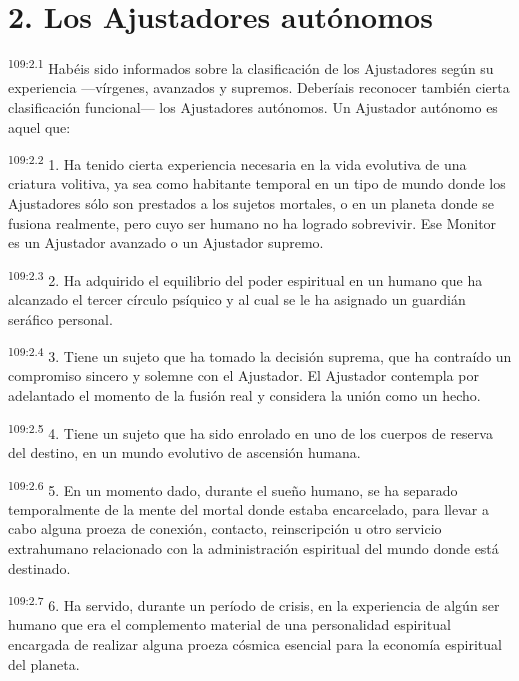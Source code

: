 \documentclass[twoside, 11pt]{book}
\begin{document}
\section*{2. Los Ajustadores autónomos}
\par
\textsuperscript{109:2.1} Habéis sido informados sobre la clasificación de los Ajustadores según su experiencia ---vírgenes, avanzados y supremos. Deberíais reconocer también cierta clasificación funcional--- los Ajustadores autónomos. Un Ajustador autónomo es aquel que:

\par
\textsuperscript{109:2.2} 1. Ha tenido cierta experiencia necesaria en la vida evolutiva de una criatura volitiva, ya sea como habitante temporal en un tipo de mundo donde los Ajustadores sólo son prestados a los sujetos mortales, o en un planeta donde se fusiona realmente, pero cuyo ser humano no ha logrado sobrevivir. Ese Monitor es un Ajustador avanzado o un Ajustador supremo.

\par
\textsuperscript{109:2.3} 2. Ha adquirido el equilibrio del poder espiritual en un humano que ha alcanzado el tercer círculo psíquico y al cual se le ha asignado un guardián seráfico personal.

\par
\textsuperscript{109:2.4} 3. Tiene un sujeto que ha tomado la decisión suprema, que ha contraído un compromiso sincero y solemne con el Ajustador. El Ajustador contempla por adelantado el momento de la fusión real y considera la unión como un hecho.

\par
\textsuperscript{109:2.5} 4. Tiene un sujeto que ha sido enrolado en uno de los cuerpos de reserva del destino, en un mundo evolutivo de ascensión humana.

\par
\textsuperscript{109:2.6} 5. En un momento dado, durante el sueño humano, se ha separado temporalmente de la mente del mortal donde estaba encarcelado, para llevar a cabo alguna proeza de conexión, contacto, reinscripción u otro servicio extrahumano relacionado con la administración espiritual del mundo donde está destinado.

\par
\textsuperscript{109:2.7} 6. Ha servido, durante un período de crisis, en la experiencia de algún ser humano que era el complemento material de una personalidad espiritual encargada de realizar alguna proeza cósmica esencial para la economía espiritual del planeta.
\end{document}
